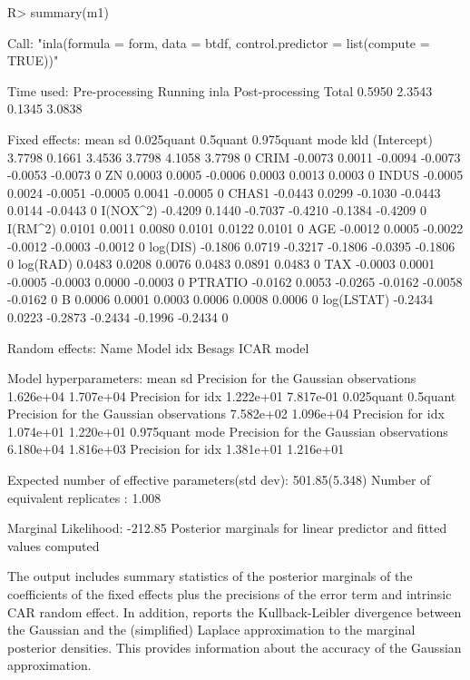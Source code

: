 \documentclass[article]{jss}
\begin{document}
\begin{Schunk}
\begin{Sinput}
R> summary(m1)
\end{Sinput}
\begin{Soutput}
Call:
"inla(formula = form, data = btdf, control.predictor = list(compute = TRUE))"

Time used:
 Pre-processing    Running inla Post-processing           Total 
         0.5950          2.3543          0.1345          3.0838 

Fixed effects:
               mean     sd 0.025quant 0.5quant 0.975quant    mode kld
(Intercept)  3.7798 0.1661     3.4536   3.7798     4.1058  3.7798   0
CRIM        -0.0073 0.0011    -0.0094  -0.0073    -0.0053 -0.0073   0
ZN           0.0003 0.0005    -0.0006   0.0003     0.0013  0.0003   0
INDUS       -0.0005 0.0024    -0.0051  -0.0005     0.0041 -0.0005   0
CHAS1       -0.0443 0.0299    -0.1030  -0.0443     0.0144 -0.0443   0
I(NOX^2)    -0.4209 0.1440    -0.7037  -0.4210    -0.1384 -0.4209   0
I(RM^2)      0.0101 0.0011     0.0080   0.0101     0.0122  0.0101   0
AGE         -0.0012 0.0005    -0.0022  -0.0012    -0.0003 -0.0012   0
log(DIS)    -0.1806 0.0719    -0.3217  -0.1806    -0.0395 -0.1806   0
log(RAD)     0.0483 0.0208     0.0076   0.0483     0.0891  0.0483   0
TAX         -0.0003 0.0001    -0.0005  -0.0003     0.0000 -0.0003   0
PTRATIO     -0.0162 0.0053    -0.0265  -0.0162    -0.0058 -0.0162   0
B            0.0006 0.0001     0.0003   0.0006     0.0008  0.0006   0
log(LSTAT)  -0.2434 0.0223    -0.2873  -0.2434    -0.1996 -0.2434   0

Random effects:
Name	  Model
 idx   Besags ICAR model 

Model hyperparameters:
                                        mean      sd       
Precision for the Gaussian observations 1.626e+04 1.707e+04
Precision for idx                       1.222e+01 7.817e-01
                                        0.025quant 0.5quant 
Precision for the Gaussian observations 7.582e+02  1.096e+04
Precision for idx                       1.074e+01  1.220e+01
                                        0.975quant mode     
Precision for the Gaussian observations 6.180e+04  1.816e+03
Precision for idx                       1.381e+01  1.216e+01

Expected number of effective parameters(std dev): 501.85(5.348)
Number of equivalent replicates : 1.008 

Marginal Likelihood:  -212.85 
Posterior marginals for linear predictor and fitted values computed
\end{Soutput}
\end{Schunk}
\noindent
The output includes summary statistics of the posterior marginals of the
coefficients of the fixed effects plus the precisions of the error term and
intrinsic CAR random effect. In addition,  reports the
Kullback-Leibler divergence between the Gaussian and the (simplified)
Laplace approximation to the marginal posterior densities. This provides
information about the accuracy of the Gaussian approximation. 
\end{document}
